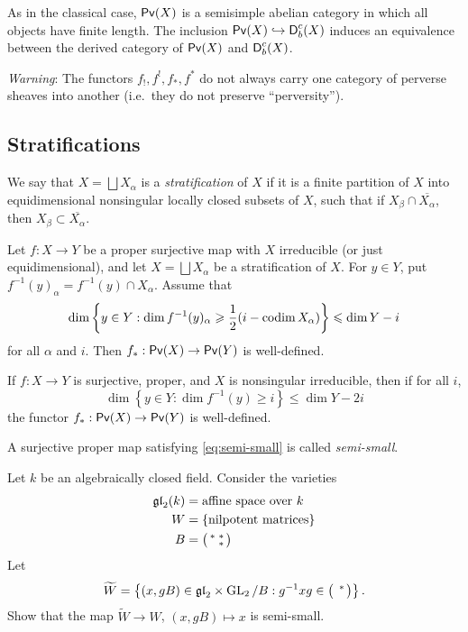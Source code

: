 \documentclass{article}
\begin{document}
As in the classical case, $\operatorname{\mathsf{Pv}}(X)$ is a semisimple abelian category in 
which all objects have finite length. The inclusion 
$\operatorname{\mathsf{Pv}}(X)\hookrightarrow \operatorname{\mathsf{D}}_b^c(X)$ induces an equivalence between 
the derived category of $\operatorname{\mathsf{Pv}}(X)$ and $\operatorname{\mathsf{D}}_b^c(X)$. 

\emph{Warning}: The functors $f_!,f^!,f_\ast,f^\ast$ do not always carry 
one category of perverse sheaves into another (i.e.\ they do not preserve 
``perversity''). 


\subsection{Stratifications}

We say that $X=\bigsqcup X_\alpha$ is a \emph{stratification} of $X$ if it is a 
finite partition of $X$ into equidimensional nonsingular locally closed subsets 
of $X$, such that if $X_\beta\cap \overline{X_\alpha}$, then 
$X_\beta\subset \overline{X_\alpha}$. 

\begin{proposition}
Let $f:X\to Y$ be a proper surjective map with $X$ irreducible (or just 
equidimensional), and let $X=\bigsqcup X_\alpha$ be a stratification of $X$. 
For $y\in Y$, put $f^{-1}(y)_\alpha = f^{-1}(y)\cap X_\alpha$. Assume that 
\[
  \dim\left\{y\in Y:\dim f^{-1}(y)_\alpha\geqslant \frac 1 2 (i-\operatorname{codim} X_\alpha)\right\} \leqslant \dim Y - i 
\]
for all $\alpha$ and $i$. Then $f_\ast:\operatorname{\mathsf{Pv}}(X) \to \operatorname{\mathsf{Pv}}(Y)$ is 
well-defined. 
\end{proposition}

\begin{corollary}
If $f:X\to Y$ is surjective, proper, and $X$ is nonsingular irreducible, then 
if for all $i$, 
\begin{equation}\label{eq:semi-small}
  \dim\left\{y\in Y:\dim f^{-1}(y) \geqslant i\right\} \leqslant \dim Y- 2 i
\end{equation}
the functor $f_\ast:\operatorname{\mathsf{Pv}}(X) \to\operatorname{\mathsf{Pv}}(Y)$ is well-defined. 
\end{corollary}

A surjective proper map satisfying \eqref{eq:semi-small} is called 
\emph{semi-small}. 

\begin{exercise}
Let $k$ be an algebraically closed field. Consider the varieties 
\begin{align*}
  \mathfrak{gl}_2(k) &= \text{affine space over }k\\
  W &= \{\text{nilpotent matrices}\} \\
  B &= \bigl(\begin{smallmatrix} \ast & \ast \\  & \ast \end{smallmatrix} \bigr) 
\end{align*}
Let 
\[
  \widetilde W = \left\{(x,g B)\in \mathfrak{gl}_2 \times \operatorname{GL}_2/B:g^{-1} x g\in \bigl(\begin{smallmatrix}  & \ast \\  &  \end{smallmatrix} \bigr)\right\} .
\]
Show that the map $\widetilde W \to W$, $(x,g B)\mapsto x$ is semi-small. 
\end{exercise}
\end{document}
